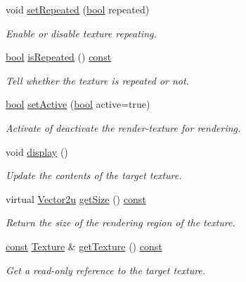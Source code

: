\begin{DoxyCompactItemize}
void \hyperlink{classsf_1_1_render_texture_af8f97b33512bf7d5b6be3da6f65f7365}{set\-Repeated} (\hyperlink{term__entry_8h_a002004ba5d663f149f6c38064926abac}{bool} repeated)
\begin{DoxyCompactList}\small\item\em Enable or disable texture repeating. \end{DoxyCompactList}\item 
\hyperlink{term__entry_8h_a002004ba5d663f149f6c38064926abac}{bool} \hyperlink{classsf_1_1_render_texture_ae480a2ec7ee166afa50232e634d2668c}{is\-Repeated} () \hyperlink{term__entry_8h_a57bd63ce7f9a353488880e3de6692d5a}{const} 
\begin{DoxyCompactList}\small\item\em Tell whether the texture is repeated or not. \end{DoxyCompactList}\item 
\hyperlink{term__entry_8h_a002004ba5d663f149f6c38064926abac}{bool} \hyperlink{classsf_1_1_render_texture_a5da95ecdbce615a80bb78399012508cf}{set\-Active} (\hyperlink{term__entry_8h_a002004ba5d663f149f6c38064926abac}{bool} active=true)
\begin{DoxyCompactList}\small\item\em Activate of deactivate the render-\/texture for rendering. \end{DoxyCompactList}\item 
void \hyperlink{classsf_1_1_render_texture_af92886d5faef3916caff9fa9ab32c555}{display} ()
\begin{DoxyCompactList}\small\item\em Update the contents of the target texture. \end{DoxyCompactList}\item 
virtual \hyperlink{namespacesf_a41039649eb65ea7646e2b97cfe124b4f}{Vector2u} \hyperlink{classsf_1_1_render_texture_a757ba45ec7a7deefcaef717049b00b8c}{get\-Size} () \hyperlink{term__entry_8h_a57bd63ce7f9a353488880e3de6692d5a}{const} 
\begin{DoxyCompactList}\small\item\em Return the size of the rendering region of the texture. \end{DoxyCompactList}\item 
\hyperlink{term__entry_8h_a57bd63ce7f9a353488880e3de6692d5a}{const} \hyperlink{classsf_1_1_texture}{Texture} \& \hyperlink{classsf_1_1_render_texture_a95bc5152c497066d31fdc57da8e17678}{get\-Texture} () \hyperlink{term__entry_8h_a57bd63ce7f9a353488880e3de6692d5a}{const} 
\begin{DoxyCompactList}\small\item\em Get a read-\/only reference to the target texture. \end{DoxyCompactList}\item 

\end{DoxyCompactItemize}
